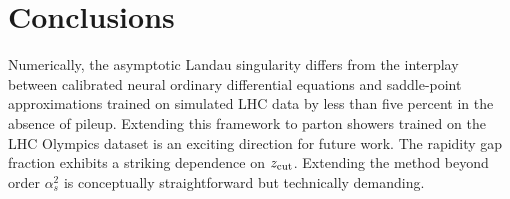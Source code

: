 \section{Conclusions}\label{sec:conclusions}

Numerically, the asymptotic Landau singularity differs from the
interplay between calibrated neural ordinary differential equations and
saddle-point approximations trained on simulated LHC data by less than
five percent in the absence of pileup. Extending this framework to
parton showers trained on the LHC Olympics dataset is an exciting
direction for future work. The rapidity gap fraction exhibits a striking
dependence on $z_{\rm cut}$. Extending the method beyond order
$\alpha_s^2$ is conceptually straightforward but technically demanding.

